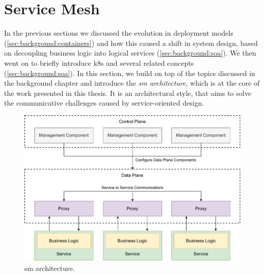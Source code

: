 \section{Service Mesh}
\label{sec:background:service-mesh}

In the previous sections we discussed the evolution in deployment models (\cref{sec:background:containers}) and how this caused a shift in system design, based on decoupling business logic into logical services (\cref{sec:background:soa}). We then went on to briefly introduce \gls{k8s} and several related concepts (\cref{sec:background:soa}). In this section, we build on top of the topics discussed in the background chapter and introduce the \textit{\gls{sm} architecture}, which is at the core of the work presented in this thesis. It is an architectural style, that aims to solve the communicative challenges caused by service-oriented design.



\begin{figure}[!t]
    \centering
    
    \includegraphics[width=\linewidth]{2_background/figures/service-mesh-architecture.pdf}

    \caption[\Gls{sm} architecture.]{\Gls{sm} architecture.}
    \label{fig:service-mesh-architecture}
\end{figure}

